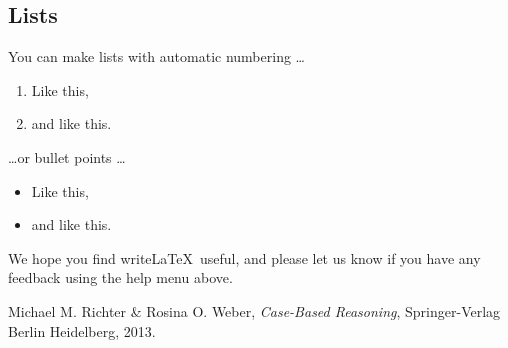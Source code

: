 \documentclass[12pt]{article}
\begin{document}
\subsection{Lists}

You can make lists with automatic numbering \dots

\begin{enumerate}
\item Like this,
\item and like this.
\end{enumerate}
\dots or bullet points \dots
\begin{itemize}
\item Like this,
\item and like this.
\end{itemize}

We hope you find write\LaTeX\ useful, and please let us know if you have any feedback using the help menu above.

\begin{thebibliography}{9}

  Michael M. Richter \& Rosina O. Weber,
  \emph{Case-Based Reasoning},
  Springer-Verlag Berlin Heidelberg,
  2013.

\end{thebibliography}
\end{document}
